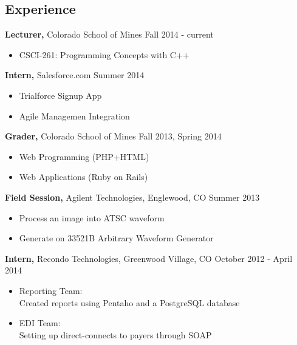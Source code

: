 \documentclass[12pt]{res}
\begin{document}

\address{{\bf Contact Information} \\ (720) 219-7914 \\ gik0geck0@gmail.com}
\address{{\bf Online Presence} \\ https://github.com/gik0geck0 \\ https://bitbucket.org/gik0geck0 }

\begin{resume}

\section{Experience}

{\bf Lecturer,} Colorado School of Mines \hfill Fall 2014 - current
\begin{itemize} \itemsep -2pt
    \item CSCI-261: Programming Concepts with C++
\end{itemize}

{\bf Intern,} Salesforce.com \hfill Summer 2014
\begin{itemize} \itemsep -2pt
    \item Trialforce Signup App
    \item Agile Managemen Integration
\end{itemize}

{\bf Grader,} Colorado School of Mines \hfill Fall 2013, Spring 2014
\begin{itemize} \itemsep -2pt
    \item Web Programming (PHP+HTML)
    \item Web Applications (Ruby on Rails)
\end{itemize}

{\bf Field Session,} Agilent Technologies, Englewood, CO \hfill Summer 2013
\begin{itemize} \itemsep -2pt
    \item Process an image into ATSC waveform
    \item Generate on 33521B Arbitrary Waveform Generator
\end{itemize}

{\bf Intern,} Recondo Technologies, Greenwood Village, CO \hfill October 2012 - April 2014
\begin{itemize} \itemsep -2pt
    \item Reporting Team: \\
            Created reports using Pentaho and a PostgreSQL database
    \item EDI Team: \\
            Setting up direct-connects to payers through SOAP
\end{itemize}


\end{resume}
\end{document}
